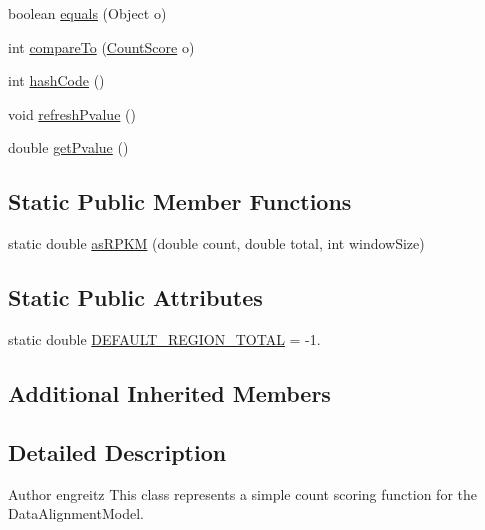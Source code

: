 \begin{DoxyCompactItemize}
\item 
boolean \hyperlink{classumms_1_1core_1_1model_1_1score_1_1_count_score_a183b9a1417706e9b6af345d6bf8cd33c}{equals} (Object o)
\item 
int \hyperlink{classumms_1_1core_1_1model_1_1score_1_1_count_score_a10ed7654d427b9467d72c30b21a0435a}{compare\+To} (\hyperlink{classumms_1_1core_1_1model_1_1score_1_1_count_score}{Count\+Score} o)
\item 
int \hyperlink{classumms_1_1core_1_1model_1_1score_1_1_count_score_ae41bff6efbdde51eac8917710dedf422}{hash\+Code} ()
\item 
void \hyperlink{classumms_1_1core_1_1model_1_1score_1_1_count_score_a20cfaece6d897e96ba1e1178eb7e0346}{refresh\+Pvalue} ()
\item 
double \hyperlink{classumms_1_1core_1_1model_1_1score_1_1_count_score_af2747cc400041fdf14c61065b2339139}{get\+Pvalue} ()
\end{DoxyCompactItemize}
\subsection*{Static Public Member Functions}
\begin{DoxyCompactItemize}
\item 
static double \hyperlink{classumms_1_1core_1_1model_1_1score_1_1_count_score_aa701b189be302b38607088500e9cfece}{as\+R\+P\+K\+M} (double count, double total, int window\+Size)
\end{DoxyCompactItemize}
\subsection*{Static Public Attributes}
\begin{DoxyCompactItemize}
\item 
static double \hyperlink{classumms_1_1core_1_1model_1_1score_1_1_count_score_a55eccfb809c04f74d0d68551d2614b3a}{D\+E\+F\+A\+U\+L\+T\+\_\+\+R\+E\+G\+I\+O\+N\+\_\+\+T\+O\+T\+A\+L} = -\/1.
\end{DoxyCompactItemize}
\subsection*{Additional Inherited Members}


\subsection{Detailed Description}
\begin{DoxyAuthor}{Author}
engreitz This class represents a simple count scoring function for the Data\+Alignment\+Model. 
\end{DoxyAuthor}


